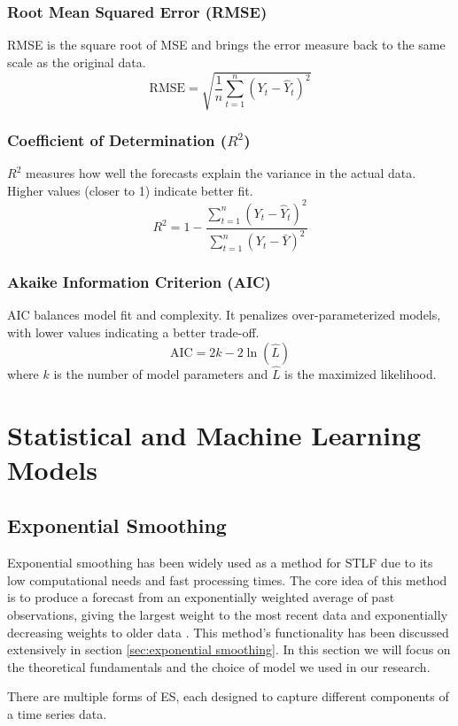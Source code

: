 \subsubsection{Root Mean Squared Error (RMSE)} 
RMSE is the square root of MSE and brings the error measure back to the same scale as the original data.  
\[
\text{RMSE} = \sqrt{\frac{1}{n}\sum_{t=1}^{n} (Y_t - \hat{Y}_t)^2}
\]

\subsubsection{Coefficient of Determination ($R^2$)} 
$R^2$ measures how well the forecasts explain the variance in the actual data. Higher values (closer to 1) indicate better fit.  
\[
R^2 = 1 - \frac{\sum_{t=1}^{n} (Y_t - \hat{Y}_t)^2}{\sum_{t=1}^{n} (Y_t - \bar{Y})^2}
\]

\subsubsection{Akaike Information Criterion (AIC)} 
AIC balances model fit and complexity. It penalizes over-parameterized models, with lower values indicating a better trade-off.  
\[
\text{AIC} = 2k - 2\ln(\hat{L})
\]
where $k$ is the number of model parameters and $\hat{L}$ is the maximized likelihood.



\section{Statistical and Machine Learning Models}
\subsection{Exponential Smoothing}

Exponential smoothing has been widely used as a method for STLF due to its low computational needs and fast processing times. The core idea of this method is to produce a forecast from an exponentially weighted average of past observations, giving the largest weight to the most recent data and exponentially decreasing weights to older data \cite{ostertagova2011simple}. This method's functionality has been discussed extensively in section \ref{sec:exponential smoothing}. In this section we will focus on the theoretical fundamentals and the choice of model we used in our research.  

There are multiple forms of ES, each designed to capture different components of a time series data.
